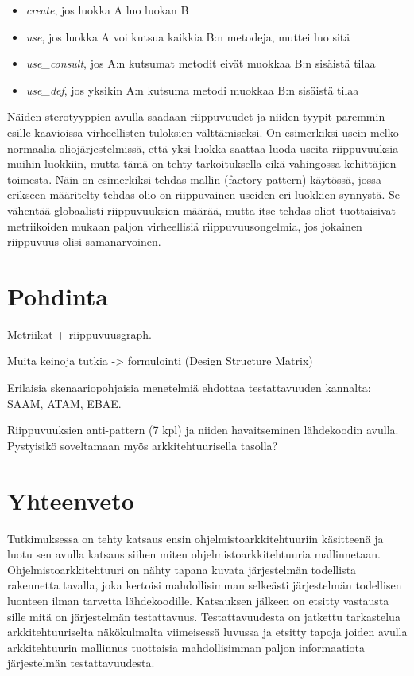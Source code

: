 \documentclass[finnish]{tktltiki2}
\theoremstyle{definition}
\theoremstyle{remark}
\begin{document}
\begin{itemize}
	\item \textit{create}, jos luokka A luo luokan B
	\item \textit{use}, jos luokka A voi kutsua kaikkia B:n metodeja, muttei luo sitä
	\item \textit{use\_consult}, jos A:n kutsumat metodit eivät muokkaa B:n sisäistä tilaa
	\item \textit{use\_def}, jos yksikin A:n kutsuma metodi muokkaa B:n sisäistä tilaa
\end{itemize}

\noindent
Näiden sterotyyppien avulla saadaan riippuvuudet ja niiden tyypit paremmin esille kaavioissa virheellisten tuloksien välttämiseksi. On esimerkiksi usein melko normaalia oliojärjestelmissä, että yksi luokka saattaa luoda useita riippuvuuksia muihin luokkiin, mutta tämä on tehty tarkoituksella eikä vahingossa kehittäjien toimesta. Näin on esimerkiksi tehdas-mallin (factory pattern) käytössä, jossa erikseen määritelty tehdas-olio on riippuvainen useiden eri luokkien synnystä. Se vähentää globaalisti riippuvuuksien määrää, mutta itse tehdas-oliot tuottaisivat metriikoiden mukaan paljon virheellisiä riippuvuusongelmia, jos jokainen riippuvuus olisi samanarvoinen.





\section{Pohdinta}




Metriikat + riippuvuusgraph.

Muita keinoja tutkia -> formulointi (Design Structure Matrix) \citep{mo_mapping_2013}

Erilaisia skenaariopohjaisia menetelmiä ehdottaa \citep[s. 8-9]{mattsson2006software} testattavuuden kannalta: SAAM, ATAM, EBAE.

Riippuvuuksien anti-pattern (7 kpl) ja niiden havaitseminen lähdekoodin avulla. Pystyisikö soveltamaan myös arkkitehtuurisella tasolla? \citep{binkley_dependence_2008} 

\section{Yhteenveto}

Tutkimuksessa on tehty katsaus ensin ohjelmistoarkkitehtuuriin käsitteenä ja luotu sen avulla katsaus siihen miten ohjelmistoarkkitehtuuria mallinnetaan. Ohjelmistoarkkitehtuuri on nähty tapana kuvata järjestelmän todellista rakennetta tavalla, joka kertoisi mahdollisimman selkeästi järjestelmän todellisen luonteen ilman tarvetta lähdekoodille. Katsauksen jälkeen on etsitty vastausta sille mitä on järjestelmän testattavuus. Testattavuudesta on jatkettu tarkastelua arkkitehtuuriselta näkökulmalta viimeisessä luvussa ja etsitty tapoja joiden avulla arkkitehtuurin mallinnus tuottaisia mahdollisimman paljon informaatiota järjestelmän testattavuudesta.
\end{document}
